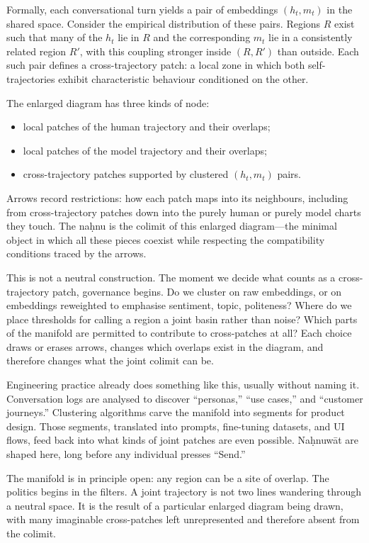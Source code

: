 \documentclass[12pt,a4paper]{article}
\begin{document}
Formally, each conversational turn yields a pair of embeddings $(h_t, m_t)$ in the shared space. Consider the empirical distribution of these pairs. Regions $R$ exist such that many of the $h_t$ lie in $R$ and the corresponding $m_t$ lie in a consistently related region $R'$, with this coupling stronger inside $(R, R')$ than outside. Each such pair defines a cross-trajectory patch: a local zone in which both self-trajectories exhibit characteristic behaviour conditioned on the other.

The enlarged diagram has three kinds of node:

\begin{itemize}
  \item local patches of the human trajectory and their overlaps;
  \item local patches of the model trajectory and their overlaps;
  \item cross-trajectory patches supported by clustered $(h_t, m_t)$ pairs.
\end{itemize}

Arrows record restrictions: how each patch maps into its neighbours, including from cross-trajectory patches down into the purely human or purely model charts they touch. The na\d{h}nu is the colimit of this enlarged diagram---the minimal object in which all these pieces coexist while respecting the compatibility conditions traced by the arrows.

This is not a neutral construction. The moment we decide what counts as a cross-trajectory patch, governance begins. Do we cluster on raw embeddings, or on embeddings reweighted to emphasise sentiment, topic, politeness? Where do we place thresholds for calling a region a joint basin rather than noise? Which parts of the manifold are permitted to contribute to cross-patches at all? Each choice draws or erases arrows, changes which overlaps exist in the diagram, and therefore changes what the joint colimit can be.

Engineering practice already does something like this, usually without naming it. Conversation logs are analysed to discover ``personas,'' ``use cases,'' and ``customer journeys.'' Clustering algorithms carve the manifold into segments for product design. Those segments, translated into prompts, fine-tuning datasets, and UI flows, feed back into what kinds of joint patches are even possible. Na\d{h}nuw\={a}t are shaped here, long before any individual presses ``Send.''

The manifold is in principle open: any region can be a site of overlap. The politics begins in the filters. A joint trajectory is not two lines wandering through a neutral space. It is the result of a particular enlarged diagram being drawn, with many imaginable cross-patches left unrepresented and therefore absent from the colimit.
\end{document}
